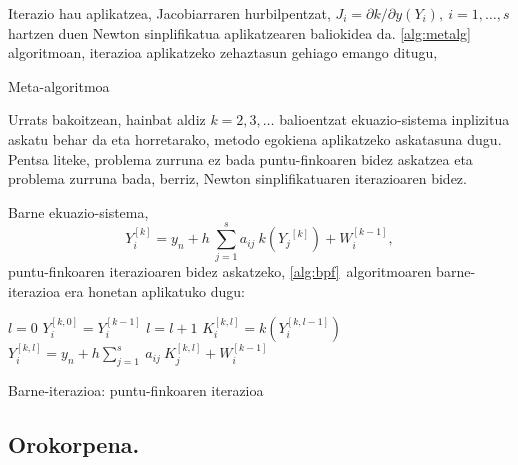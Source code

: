 Iterazio hau aplikatzea, Jacobiarraren hurbilpentzat, $J_i=\partial k/ \partial y (Y_i), \ i=1,\dots,s$ hartzen duen Newton sinplifikatua aplikatzearen baliokidea da. \ref{alg:metalg} algoritmoan, iterazioa aplikatzeko zehaztasun gehiago emango ditugu,
 
\begin{algorithm}[H]
 \caption{Meta-algoritmoa}
 \label{alg:metalg}
\end{algorithm}

Urrats bakoitzean, hainbat aldiz $k=2,3,\dots$ balioentzat ekuazio-sistema inplizitua askatu behar da eta horretarako, 
metodo egokiena aplikatzeko askatasuna dugu. Pentsa liteke,  problema zurruna ez bada puntu-finkoaren bidez askatzea eta problema zurruna bada, berriz,  Newton sinplifikatuaren iterazioaren bidez.

Barne ekuazio-sistema,
\begin{equation*}
 Y_i^{[k]}=y_n+h\  \sum^s_{j=1}{a_{ij}\ k({Y_j}^{[k]})+W^{[k-1]}_i},
\end{equation*}
puntu-finkoaren iterazioaren bidez askatzeko, \ref{alg:bpf}~algoritmoaren barne-iterazioa era honetan aplikatuko dugu: 

\begin{algorithm}[H]
 \BlankLine
  $l=0$\;
  $Y_{i}^{[k,0]}=Y_{i}^{[k-1]}$\;
  {
   \BlankLine
   $l=l+1$\;  
   \BlankLine
   $K_{i}^{[k,l]}=k(Y_{i}^{[k,l-1]})$\;
   $Y_{i}^{[k,l]}=y_{n} + h \sum\limits_{j=1}^{s} \ a_{ij} \ K_{j}^{[k,l]}  +  W_{i}^{[k-1]} $\;
  }
 \caption{Barne-iterazioa: puntu-finkoaren iterazioa}
 \label{alg:bpf}
\end{algorithm}


\subsection*{Orokorpena.}

